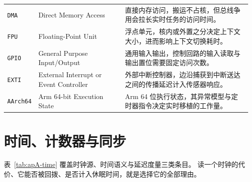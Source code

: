 \documentclass[12pt,a4paper,fontset=fandol]{ctexbook}
\newcommand{\Tp}[1]{\texttt{#1}}
\begin{document}
\begin{longtable}{@{} >{\raggedright\arraybackslash}p{} >{\raggedright\arraybackslash}p{} >{\raggedright\arraybackslash}p{}@{}}
\Tp{DMA} & Direct Memory Access & 直接内存访问，搬运不占核，但总线争用会拉长实时任务的访问时间。 \\
\Tp{FPU} & Floating-Point Unit & 浮点单元，核内或外置之分决定上下文大小，进而影响上下文切换耗时。 \\
\Tp{GPIO} & General Purpose Input/Output & 通用输入输出，控制回路的输入读取与输出置位需要固定访问次数。 \\
\Tp{EXTI} & External Interrupt or Event Controller & 外部中断控制器，边沿捕获到中断送达之间的传播延迟计入传感器响应。 \\
\Tp{AArch64} & Arm 64-bit Execution State & Arm 64 位执行状态，其异常模型与定时器指令决定实时移植的工作量。 \\
\end{longtable}

\section{时间、计数器与同步}

表~\ref{tab:apA-time} 覆盖时钟源、时间语义与延迟度量三类条目。
读一个时钟的代价、它能否被回拨、是否计入休眠时间，就是选择它的全部理由。
\end{document}
